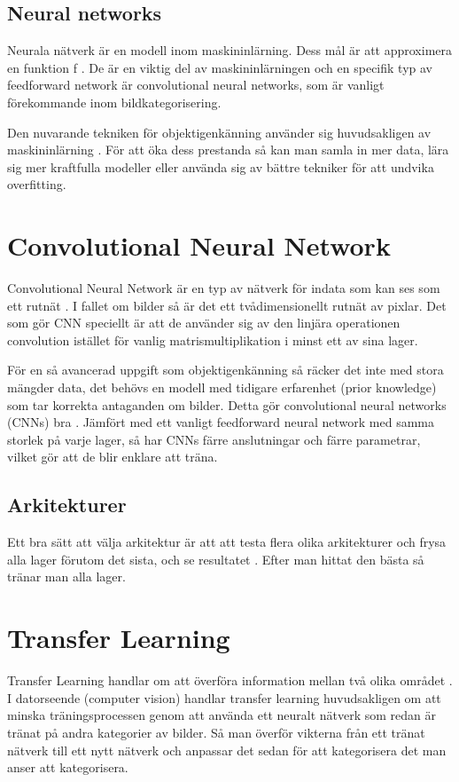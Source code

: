 \documentclass{kththesis}
\begin{document}
    \subsection{Neural networks}
    Neurala nätverk är en modell inom maskininlärning. Dess mål är att approximera en funktion f \parencite{Goodfellow-et-al-2016}. De är en viktig del av maskininlärningen och en specifik typ av feedforward network är convolutional neural networks, som är vanligt förekommande inom bildkategorisering. 

    Den nuvarande tekniken för objektigenkänning använder sig huvudsakligen av maskininlärning \parencite{krizhevsky_imagenet_2012}. För att öka dess prestanda så kan man samla in mer data, lära sig mer kraftfulla modeller eller använda sig av bättre tekniker för att undvika overfitting.

  \section{Convolutional Neural Network}
  Convolutional Neural Network är en typ av nätverk för indata som kan ses som ett rutnät \parencite{Goodfellow-et-al-2016}. I fallet om bilder så är det ett tvådimensionellt rutnät av pixlar. Det som gör CNN speciellt är att de använder sig av den linjära operationen convolution istället för vanlig matrismultiplikation i minst ett av sina lager.

  För en så avancerad uppgift som objektigenkänning så räcker det inte med stora mängder data, det behövs en modell med tidigare erfarenhet (prior knowledge) som tar korrekta antaganden om bilder. Detta gör convolutional neural networks (CNNs) bra \parencite{krizhevsky_imagenet_2012}. Jämfört med ett vanligt feedforward neural network med samma storlek på varje lager, så har CNNs färre anslutningar och färre parametrar, vilket gör att de blir enklare att träna.


  

    \subsection{Arkitekturer}
    Ett bra sätt att välja arkitektur är att att testa flera olika arkitekturer och frysa alla lager förutom det sista, och se resultatet \parencite{Goodfellow-et-al-2016}. Efter man hittat den bästa så tränar man alla lager.

  \section{Transfer Learning}
  Transfer Learning handlar om att överföra information mellan två olika området \parencite{oquab_learning_2014}. I datorseende (computer vision) handlar transfer learning huvudsakligen om att minska träningsprocessen genom att använda ett neuralt nätverk som redan är tränat på andra kategorier av bilder. Så man överför vikterna från ett tränat nätverk till ett nytt nätverk och anpassar det sedan för att kategorisera det man anser att kategorisera.
\end{document}
